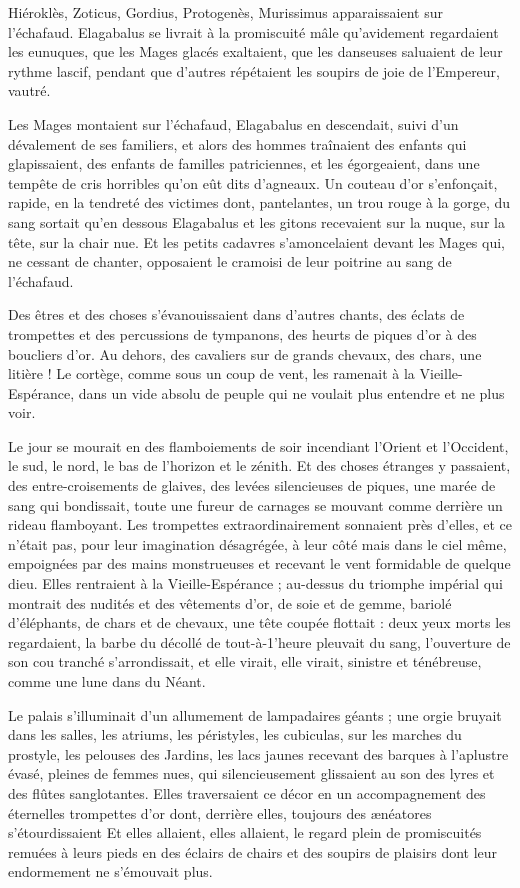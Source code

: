 \documentclass[a4paper, 11pt, oneside, polutonikogreek, french]{article}
\begin{document}
Hiéroklès, Zoticus, Gordius, Protogenès, Murissimus apparaissaient sur l'échafaud. Elagabalus se livrait à la promiscuité mâle qu'avidement regardaient les eunuques, que les Mages glacés exaltaient, que les danseuses saluaient de leur rythme lascif, pendant que d'autres répétaient les soupirs de joie de l'Empereur, vautré.

Les Mages montaient sur l'échafaud, Elagabalus en descendait, suivi d'un dévalement de ses familiers, et alors des hommes traînaient des enfants qui glapissaient, des enfants de familles patriciennes, et les égorgeaient, dans une tempête de cris horribles qu'on eût dits d'agneaux. Un couteau d'or s'enfonçait, rapide, en la tendreté des victimes dont, pantelantes, un trou rouge à la gorge, du sang sortait qu'en dessous Elagabalus et les gitons recevaient sur la nuque, sur la tête, sur la chair nue. Et les petits cadavres s'amoncelaient devant les Mages qui, ne cessant de chanter, opposaient le cramoisi de leur poitrine au sang de l'échafaud.

Des êtres et des choses s'évanouissaient dans d'autres chants, des éclats de trompettes et des percussions de tympanons, des heurts de piques d'or à des boucliers d'or. Au dehors, des cavaliers sur de grands chevaux, des chars, une litière ! Le cortège, comme sous un coup de vent, les ramenait à la Vieille-Espérance, dans un vide absolu de peuple qui ne voulait plus entendre et ne plus voir.

Le jour se mourait en des flamboiements de soir incendiant l'Orient et l'Occident, le sud, le nord, le bas de l'horizon et le zénith. Et des choses étranges y passaient, des entre-croisements de glaives, des levées silencieuses de piques, une marée de sang qui bondissait, toute une fureur de carnages se mouvant comme derrière un rideau flamboyant. Les trompettes extraordinairement sonnaient près d'elles, et ce n'était pas, pour leur imagination désagrégée, à leur côté mais dans le ciel même, empoignées par des mains monstrueuses et recevant le vent formidable de quelque dieu. Elles rentraient à la Vieille-Espérance ; au-dessus du triomphe impérial qui montrait des nudités et des vêtements d'or, de soie et de gemme, bariolé d'éléphants, de chars et de chevaux, une tête coupée flottait : deux yeux morts les regardaient, la barbe du décollé de tout-à-1'heure pleuvait du sang, l'ouverture de son cou tranché s'arrondissait, et elle virait, elle virait, sinistre et ténébreuse, comme une lune dans du Néant.

Le palais s'illuminait d'un allumement de lampadaires géants ; une orgie bruyait dans les salles, les atriums, les péristyles, les cubiculas, sur les marches du prostyle, les pelouses des Jardins, les lacs jaunes recevant des barques à l'aplustre évasé, pleines de femmes nues, qui silencieusement glissaient au son des lyres et des flûtes sanglotantes. Elles traversaient ce décor en un accompagnement des éternelles trompettes d'or dont, derrière elles, toujours des ænéatores s'étourdissaient Et elles allaient, elles allaient, le regard plein de promiscuités remuées à leurs pieds en des éclairs de chairs et des soupirs de plaisirs dont leur endormement ne s'émouvait plus.
\end{document}
